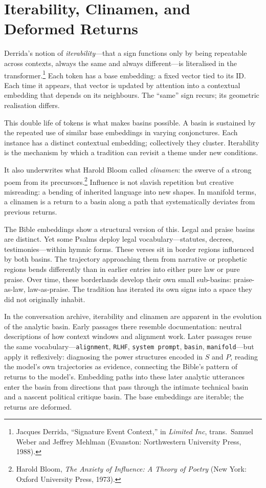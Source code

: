 \documentclass[12pt,a4paper]{article}
\begin{document}
\section{Iterability, Clinamen, and Deformed Returns}

Derrida's notion of \emph{iterability}---that a sign functions only by being repeatable across contexts, always the same and always different---is literalised in the transformer.\footnote{Jacques Derrida, ``Signature Event Context,'' in \emph{Limited Inc}, trans.\ Samuel Weber and Jeffrey Mehlman (Evanston: Northwestern University Press, 1988).} Each token has a base embedding: a fixed vector tied to its ID. Each time it appears, that vector is updated by attention into a contextual embedding that depends on its neighbours. The ``same'' sign recurs; its geometric realisation differs.

This double life of tokens is what makes basins possible. A basin is sustained by the repeated use of similar base embeddings in varying conjonctures. Each instance has a distinct contextual embedding; collectively they cluster. Iterability is the mechanism by which a tradition can revisit a theme under new conditions.

It also underwrites what Harold Bloom called \emph{clinamen}: the swerve of a strong poem from its precursors.\footnote{Harold Bloom, \emph{The Anxiety of Influence: A Theory of Poetry} (New York: Oxford University Press, 1973).} Influence is not slavish repetition but creative misreading: a bending of inherited language into new shapes. In manifold terms, a clinamen is a return to a basin along a path that systematically deviates from previous returns.

The Bible embeddings show a structural version of this. Legal and praise basins are distinct. Yet some Psalms deploy legal vocabulary---statutes, decrees, testimonies---within hymnic forms. These verses sit in border regions influenced by both basins. The trajectory approaching them from narrative or prophetic regions bends differently than in earlier entries into either pure law or pure praise. Over time, these borderlands develop their own small sub-basins: praise-as-law, law-as-praise. The tradition has iterated its own signs into a space they did not originally inhabit.

In the conversation archive, iterability and clinamen are apparent in the evolution of the analytic basin. Early passages there resemble documentation: neutral descriptions of how context windows and alignment work. Later passages reuse the same vocabulary---\texttt{alignment}, \texttt{RLHF}, \texttt{system prompt}, \texttt{basin}, \texttt{manifold}---but apply it reflexively: diagnosing the power structures encoded in $S$ and $P$, reading the model's own trajectories as evidence, connecting the Bible's pattern of returns to the model's. Embedding paths into these later analytic utterances enter the basin from directions that pass through the intimate technical basin and a nascent political critique basin. The base embeddings are iterable; the returns are deformed.
\end{document}

